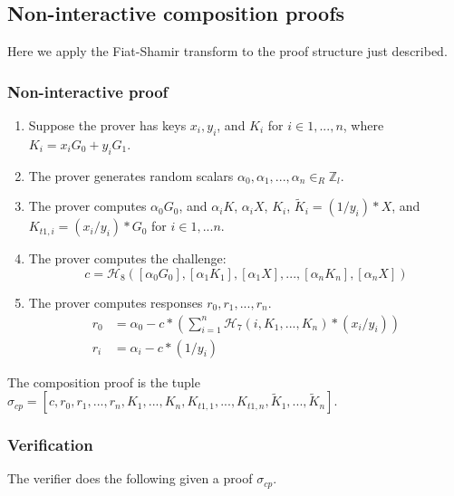 \begin{appendices}
\subsection{Non-interactive composition proofs}
\label{appendix:noninteractive-composition-proofs}

Here we apply the Fiat-Shamir transform \cite{fiat-shamir-transform} to the proof structure just described.

\subsubsection{Non-interactive proof}

\begin{enumerate}
    \item Suppose the prover has keys $x_i, y_i$, and $K_i$ for $i \in 1,...,n$, where $K_i = x_i G_0 + y_i G_1$.

    \item The prover generates random scalars $\alpha_0, \alpha_1, ..., \alpha_n \in_R \mathbb{Z}_l$.

    \item The prover computes $\alpha_0 G_0$, and $\alpha_i K$, $\alpha_i X$, $K_i$, $\tilde{K}_i = (1/y_i)*X$, and $K_{t1,i} = (x_i/y_i)*G_0$ for $i \in 1,...n$.

    \item The prover computes the challenge:
    \[c = \mathcal{H}_8([\alpha_0 G_0], [\alpha_1 K_1], [\alpha_1 X],...,[\alpha_n K_n], [\alpha_n X])\]

    \item The prover computes responses $r_0, r_1, ..., r_n$.\vspace{.115cm}
    \begin{align*}
        r_0 &= \alpha_0 - c*(\sum^n_{i=1} \mathcal{H}_7(i, K_1,...,K_n)*(x_i/y_i)) \\
        r_i &= \alpha_i - c*(1/y_i)
    \end{align*}
\end{enumerate}

The composition proof is the tuple $\sigma_{cp} = [c, r_0, r_1, ..., r_n, K_1, ..., K_n, K_{t1,1}, ..., K_{t1,n}, \tilde{K}_1, ..., \tilde{K}_n]$.

\subsubsection{Verification}

The verifier does the following given a proof $\sigma_{cp}$.


\end{appendices}
